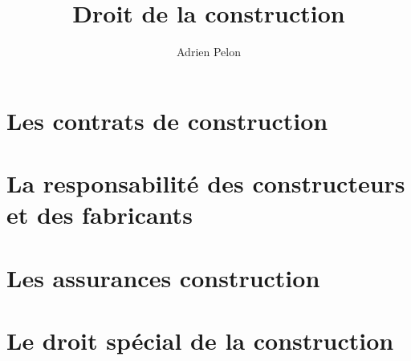 \documentclass[10pt,a4paper]{book}
\author{Adrien Pelon}
\title{Droit de la construction}
\begin{document}
	\maketitle
	
	
	
	
	\part{Les contrats de construction}
		
		
		
		
		
	\part{La responsabilité des constructeurs et des fabricants}
	
		
		
		
	
	\part{Les assurances construction}
	
		
		
	
	\part{Le droit spécial de la construction}
	
		
		
		
		
	\tableofcontents
	
\end{document}
